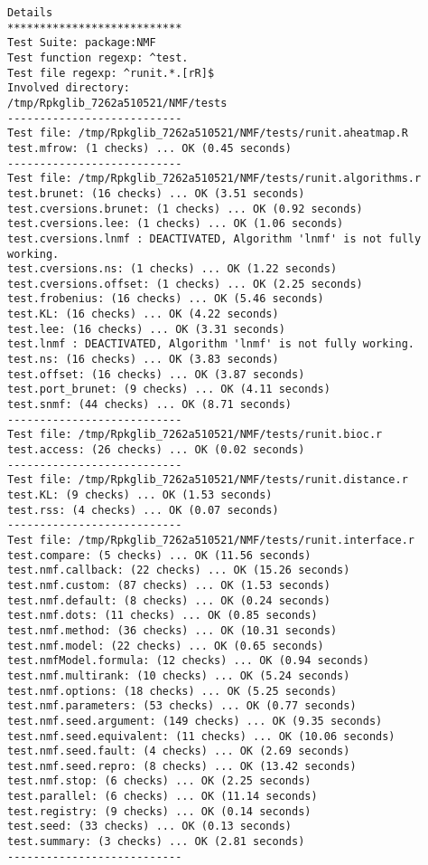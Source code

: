 \documentclass[10pt]{article}\usepackage[]{graphicx}\usepackage[]{color}
\begin{document}
\begin{verbatim}
Details 
*************************** 
Test Suite: package:NMF 
Test function regexp: ^test. 
Test file regexp: ^runit.*.[rR]$ 
Involved directory: 
/tmp/Rpkglib_7262a510521/NMF/tests 
--------------------------- 
Test file: /tmp/Rpkglib_7262a510521/NMF/tests/runit.aheatmap.R 
test.mfrow: (1 checks) ... OK (0.45 seconds)
--------------------------- 
Test file: /tmp/Rpkglib_7262a510521/NMF/tests/runit.algorithms.r 
test.brunet: (16 checks) ... OK (3.51 seconds)
test.cversions.brunet: (1 checks) ... OK (0.92 seconds)
test.cversions.lee: (1 checks) ... OK (1.06 seconds)
test.cversions.lnmf : DEACTIVATED, Algorithm 'lnmf' is not fully working.
test.cversions.ns: (1 checks) ... OK (1.22 seconds)
test.cversions.offset: (1 checks) ... OK (2.25 seconds)
test.frobenius: (16 checks) ... OK (5.46 seconds)
test.KL: (16 checks) ... OK (4.22 seconds)
test.lee: (16 checks) ... OK (3.31 seconds)
test.lnmf : DEACTIVATED, Algorithm 'lnmf' is not fully working.
test.ns: (16 checks) ... OK (3.83 seconds)
test.offset: (16 checks) ... OK (3.87 seconds)
test.port_brunet: (9 checks) ... OK (4.11 seconds)
test.snmf: (44 checks) ... OK (8.71 seconds)
--------------------------- 
Test file: /tmp/Rpkglib_7262a510521/NMF/tests/runit.bioc.r 
test.access: (26 checks) ... OK (0.02 seconds)
--------------------------- 
Test file: /tmp/Rpkglib_7262a510521/NMF/tests/runit.distance.r 
test.KL: (9 checks) ... OK (1.53 seconds)
test.rss: (4 checks) ... OK (0.07 seconds)
--------------------------- 
Test file: /tmp/Rpkglib_7262a510521/NMF/tests/runit.interface.r 
test.compare: (5 checks) ... OK (11.56 seconds)
test.nmf.callback: (22 checks) ... OK (15.26 seconds)
test.nmf.custom: (87 checks) ... OK (1.53 seconds)
test.nmf.default: (8 checks) ... OK (0.24 seconds)
test.nmf.dots: (11 checks) ... OK (0.85 seconds)
test.nmf.method: (36 checks) ... OK (10.31 seconds)
test.nmf.model: (22 checks) ... OK (0.65 seconds)
test.nmfModel.formula: (12 checks) ... OK (0.94 seconds)
test.nmf.multirank: (10 checks) ... OK (5.24 seconds)
test.nmf.options: (18 checks) ... OK (5.25 seconds)
test.nmf.parameters: (53 checks) ... OK (0.77 seconds)
test.nmf.seed.argument: (149 checks) ... OK (9.35 seconds)
test.nmf.seed.equivalent: (11 checks) ... OK (10.06 seconds)
test.nmf.seed.fault: (4 checks) ... OK (2.69 seconds)
test.nmf.seed.repro: (8 checks) ... OK (13.42 seconds)
test.nmf.stop: (6 checks) ... OK (2.25 seconds)
test.parallel: (6 checks) ... OK (11.14 seconds)
test.registry: (9 checks) ... OK (0.14 seconds)
test.seed: (33 checks) ... OK (0.13 seconds)
test.summary: (3 checks) ... OK (2.81 seconds)
--------------------------- 

\end{verbatim}
\end{document}
